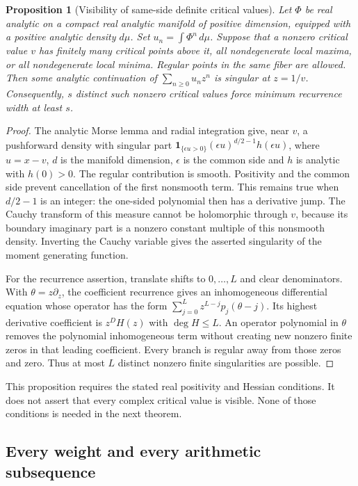 \documentclass[11pt,a4paper]{article}
\newtheorem{proposition}[theorem]{Proposition}
\theoremstyle{definition}
\theoremstyle{remark}
\numberwithin{equation}{section}
\begin{document}
\begin{proposition}[Visibility of same-side definite critical values]
\label{E:ac:visibility}
Let $\Phi$ be real analytic on a compact real analytic manifold of
positive dimension, equipped with a positive analytic density $d\mu$.
Set $u_n=\int\Phi^n\,d\mu$. Suppose that a nonzero critical value $v$
has finitely many critical points above it, all nondegenerate local
maxima, or all nondegenerate local minima. Regular points in the same
fiber are allowed. Then some analytic continuation of
$\sum_{n\ge0}u_nz^n$ is singular at $z=1/v$. Consequently, $s$
distinct such nonzero critical values force minimum recurrence width
at least $s$.
\end{proposition}
\begin{proof}
The analytic Morse lemma and radial integration give, near $v$, a
pushforward density with singular part
$\mathbf1_{\{\epsilon u>0\}}(\epsilon u)^{d/2-1}h(\epsilon u)$,
where $u=x-v$, $d$ is the manifold dimension, $\epsilon$ is the
common side and $h$ is analytic with $h(0)>0$. The regular contribution
is smooth. Positivity and the common side prevent cancellation of the
first nonsmooth term. This remains true when $d/2-1$ is an integer:
the one-sided polynomial then has a derivative jump. The Cauchy
transform of this measure cannot be holomorphic through $v$, because
its boundary imaginary part is a nonzero constant multiple of this
nonsmooth density. Inverting the Cauchy variable gives the asserted
singularity of the moment generating function.

For the recurrence assertion, translate shifts to $0,\ldots,L$ and
clear denominators. With $\theta=z\partial_z$, the coefficient
recurrence gives an inhomogeneous differential equation whose operator
has the form $\sum_{j=0}^Lz^{L-j}p_j(\theta-j)$. Its highest derivative
coefficient is $z^D H(z)$ with $\deg H\le L$. An operator polynomial
in $\theta$ removes the polynomial inhomogeneous term without creating
new nonzero finite zeros in that leading coefficient. Every branch is
regular away from those zeros and zero. Thus at most $L$ distinct
nonzero finite singularities are possible.
\end{proof}

This proposition requires the stated real positivity and Hessian
conditions. It does not assert that every complex critical value is
visible. None of those conditions is needed in the next theorem.

\subsection{Every weight and every arithmetic subsequence}
\end{document}
